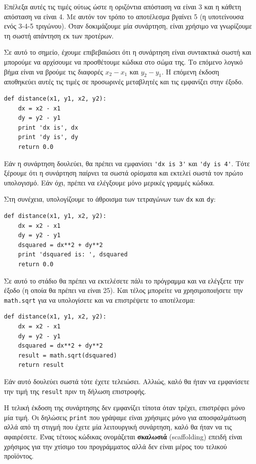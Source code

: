 \documentclass[10pt]{book}
\begin{document}
Επέλεξα αυτές τις τιμές ούτως ώστε η οριζόντια απόσταση να είναι 3 και η
κάθετη απόσταση να είναι 4. Με αυτόν τον τρόπο το αποτέλεσμα βγαίνει 5
(η υποτείνουσα ενός 3-4-5 τριγώνου). Όταν δοκιμάζουμε μία συνάρτηση, είναι
χρήσιμο να γνωρίζουμε τη σωστή απάντηση εκ των προτέρων.

Σε αυτό το σημείο, έχουμε επιβεβαιώσει ότι η συνάρτηση είναι συντακτικά σωστή
και μπορούμε να αρχίσουμε να προσθέτουμε κώδικα στο σώμα της.
Το επόμενο λογικό βήμα είναι να βρούμε τις διαφορές $x_2 - x_1$ και $y_2 - y_1$. Η επόμενη έκδοση αποθηκεύει αυτές τις τιμές σε προσωρινές μεταβλητές και τις εμφανίζει στην έξοδο.


\begin{verbatim}
def distance(x1, y1, x2, y2):
    dx = x2 - x1
    dy = y2 - y1
    print 'dx is', dx
    print 'dy is', dy
    return 0.0
\end{verbatim}
%

Εάν η συνάρτηση δουλεύει, θα πρέπει να εμφανίσει \verb"'dx is 3'" και 
\verb"'dy is 4'". Τότε ξέρουμε ότι η συνάρτηση παίρνει τα σωστά ορίσματα και εκτελεί σωστά τον πρώτο υπολογισμό. Εάν όχι, πρέπει να ελέγξουμε μόνο μερικές γραμμές κώδικα.

Στη συνέχεια, υπολογίζουμε το άθροισμα των τετραγώνων των {\tt dx} και {\tt dy}:

\begin{verbatim}
def distance(x1, y1, x2, y2):
    dx = x2 - x1
    dy = y2 - y1
    dsquared = dx**2 + dy**2
    print 'dsquared is: ', dsquared
    return 0.0
\end{verbatim}
%

Σε αυτό το στάδιο θα πρέπει να εκτελέσετε πάλι το πρόγραμμα και να ελέγξετε την
έξοδο (η οποία θα πρέπει να είναι 25). Και τέλος μπορείτε να χρησιμοποιήσετε την {\tt math.sqrt} για να υπολογίσετε και να επιστρέψετε το αποτέλεσμα:

\begin{verbatim}
def distance(x1, y1, x2, y2):
    dx = x2 - x1
    dy = y2 - y1
    dsquared = dx**2 + dy**2
    result = math.sqrt(dsquared)
    return result
\end{verbatim}
%

Εάν αυτό δουλεύει σωστά τότε έχετε τελειώσει. Αλλιώς, καλό θα ήταν
να εμφανίσετε την τιμή της {\tt result} πριν τη δήλωση επιστροφής.

Η τελική έκδοση της συνάρτησης δεν εμφανίζει τίποτα όταν τρέχει, επιστρέφει
μόνο μία τιμή. Οι δηλώσεις {\tt print} που γράψαμε είναι χρήσιμες μόνο για
αποσφαλμάτωση αλλά από τη στιγμή που έχετε μία λειτουργική συνάρτηση, καλό θα ήταν να τις αφαιρέσετε. Ένας τέτοιος κώδικας ονομάζεται {\bf σκαλωσιά} (scaffolding) επειδή είναι χρήσιμος για την χτίσιμο του προγράμματος αλλά δεν είναι μέρος του τελικού προϊόντος.
\end{document}
